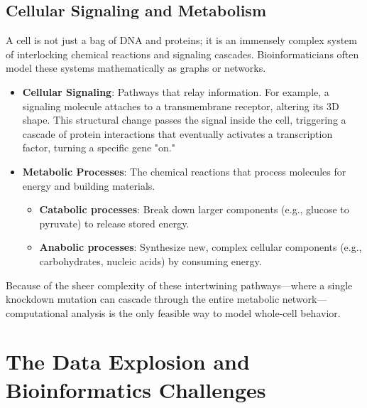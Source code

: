 \subsection{Cellular Signaling and Metabolism}
A cell is not just a bag of DNA and proteins; it is an immensely complex system of interlocking chemical reactions and signaling cascades. Bioinformaticians often model these systems mathematically as graphs or networks.

\begin{itemize}
    \item \textbf{Cellular Signaling}: Pathways that relay information. For example, a signaling molecule attaches to a transmembrane receptor, altering its 3D shape. This structural change passes the signal inside the cell, triggering a cascade of protein interactions that eventually activates a transcription factor, turning a specific gene "on."
    \item \textbf{Metabolic Processes}: The chemical reactions that process molecules for energy and building materials.
    \begin{itemize}
        \item \textbf{Catabolic processes}: Break down larger components (e.g., glucose to pyruvate) to release stored energy.
        \item \textbf{Anabolic processes}: Synthesize new, complex cellular components (e.g., carbohydrates, nucleic acids) by consuming energy.
    \end{itemize}
\end{itemize}


Because of the sheer complexity of these intertwining pathways—where a single knockdown mutation can cascade through the entire metabolic network—computational analysis is the only feasible way to model whole-cell behavior.

\section{The Data Explosion and Bioinformatics Challenges}

